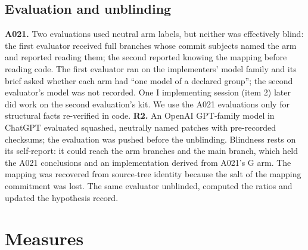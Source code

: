 \documentclass[10pt,conference]{IEEEtran}
\newcommand{\G}{G}
\newcommand{\I}{I}
\begin{document}
\subsection{Evaluation and unblinding}\label{sec:design-eval}
\textbf{A021.} Two evaluations used neutral arm labels, but neither was effectively blind: the first evaluator received full branches whose commit subjects named the arm and reported reading them; the second reported knowing the mapping before reading code. The first evaluator ran on the implementers' model family and its brief asked whether each arm had ``one model of a declared group''; the second evaluator's model was not recorded. One \I{} implementing session (item 2) later did work on the second evaluation's kit. We use the A021 evaluations only for structural facts re-verified in code. %
\textbf{R2.} An OpenAI GPT-family model in ChatGPT evaluated squashed, neutrally named patches with pre-recorded checksums; the evaluation was pushed before the unblinding. Blindness rests on its self-report: it could reach the arm branches and the main branch, which held the A021 conclusions and an implementation derived from A021's \G{} arm. The mapping was recovered from source-tree identity because the salt of the mapping commitment was lost. The same evaluator unblinded, computed the ratios and updated the hypothesis record. %

\section{Measures}\label{sec:measures}
\end{document}

